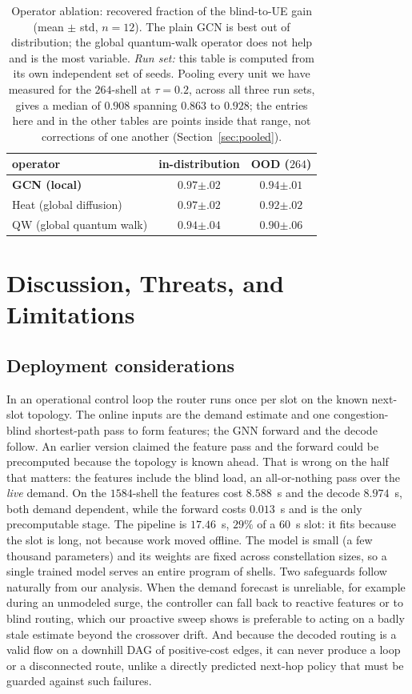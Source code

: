 \documentclass[journal]{IEEEtran}
\begin{document}
\begin{table}[t]
\centering\footnotesize\setlength{\tabcolsep}{3pt}
\caption{Operator ablation: recovered fraction of the blind-to-UE gain (mean $\pm$ std,
$n{=}12$). The plain GCN is best out of distribution; the global quantum-walk operator
does not help and is the most variable. \emph{Run set:} this table is computed from its own independent set of seeds. Pooling every unit we have measured for the $264$-shell at $\tau=0.2$, across all three run sets, gives a median of $0.908$ spanning $0.863$ to $0.928$; the entries here and in the other tables are points inside that range, not corrections of one another (Section~\ref{sec:pooled}).}
\label{tab:ablation}
\begin{tabular}{lcc}
\toprule
operator & in-distribution & OOD ($264$) \\
\midrule
\textbf{GCN (local)} & $0.97{\scriptstyle\pm.02}$ & $\mathbf{0.94{\scriptstyle\pm.01}}$ \\
Heat (global diffusion) & $0.97{\scriptstyle\pm.02}$ & $0.92{\scriptstyle\pm.02}$ \\
QW (global quantum walk) & $0.94{\scriptstyle\pm.04}$ & $0.90{\scriptstyle\pm.06}$ \\
\bottomrule
\end{tabular}
\end{table}

\section{Discussion, Threats, and Limitations}\label{sec:disc}
\subsection{Deployment considerations}\label{sec:deploy}
In an operational control loop the router runs once per slot on the known next-slot
topology. The online inputs are the demand estimate and one congestion-blind shortest-path pass to form features; the GNN forward and the decode follow. An earlier version claimed the feature pass and the forward could be precomputed because the topology is known ahead. That is wrong on the half that matters: the features include the blind load, an all-or-nothing pass over the \emph{live} demand. On the $1584$-shell the features cost $8.588$~s and the decode $8.974$~s, both demand dependent, while the forward costs $0.013$~s and is the only precomputable stage. The pipeline is $17.46$~s, $29\%$ of a $60$~s slot: it fits because the slot is long, not because work moved offline. The model is small (a
few thousand parameters) and its weights are fixed across constellation sizes, so a
single trained model serves an entire program of shells. Two safeguards follow naturally
from our analysis. When the demand forecast is unreliable, for example during an
unmodeled surge, the controller can fall back to reactive features or to blind routing,
which our proactive sweep shows is preferable to acting on a badly stale estimate beyond
the crossover drift. And because the decoded routing is a valid flow on a downhill DAG of
positive-cost edges, it can never produce a loop or a disconnected route, unlike a directly
predicted next-hop policy that must be guarded against such failures.
\end{document}
